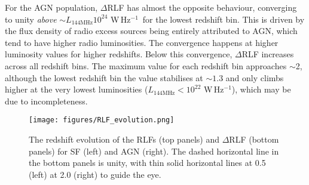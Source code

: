 \documentclass[usenatbib,fleqn,letters]{mnras}
\newcommand{\wphz}{$\,$W$\,$Hz$^{-1}$}
\newcommand{\llof}{$L_{\textrm{144MHz}}$}
\begin{document}
For the AGN population, $\Delta$RLF has almost the opposite behaviour, converging to unity \textit{above} $\sim$\llof $10^{24}\,$\wphz\ for the lowest redshift bin. This is driven by the flux density of radio excess sources being entirely attributed to AGN, which tend to have higher radio luminosities. The convergence happens at higher luminosity values for higher redshifts. Below this convergence, $\Delta$RLF increases across all redshift bins. The maximum value for each redshift bin approaches $\sim$2, although the lowest redshift bin the value stabilises at $\sim1.3$ and only climbs higher at the very lowest luminosities (\llof $<10^{22}\,$\wphz ), which may be due to incompleteness. %


\begin{figure*}
    \centering
    \texttt{[image: figures/RLF\_evolution.png]}
    \caption{The redshift evolution of the RLFs (top panels) and $\Delta$RLF (bottom panels) for SF (left) and AGN (right). The dashed horizontal line in the bottom panels is unity, with thin solid horizontal lines at 0.5 (left) at 2.0 (right) to guide the eye.  }
    \label{fig:evolution}
\end{figure*}
\end{document}
